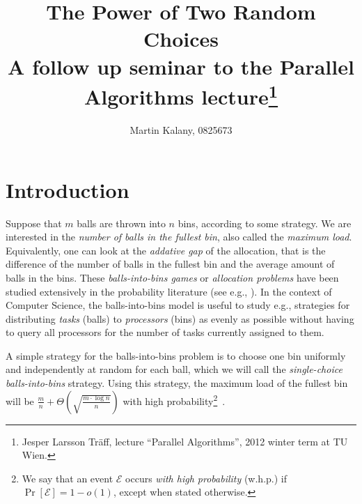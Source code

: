 \documentclass[a4paper,12pt]{article}
\begin{document}
\title{The Power of Two Random Choices\\ 
\large A follow up seminar to the Parallel Algorithms lecture\footnote{Jesper Larsson Träff, lecture ``Parallel Algorithms'', 2012 winter term at TU Wien.}}
\author{Martin Kalany, 0825673}

\maketitle


\begin{abstract}

\end{abstract}


\section{Introduction}
\label{sec:intro}
Suppose that $m$ balls are thrown into $n$ bins, according to some strategy. We are interested in the \emph{number of balls in the fullest bin}, also called the \emph{maximum load}. Equivalently, one can look at the \emph{addative gap} of the allocation, that is the difference of the number of balls in the fullest bin and the average amount of balls in the bins. These \emph{balls-into-bins games} or \emph{allocation problems} have been studied extensively in the probability literature (see e.g., \cite{JK77}). In the context of Computer Science, the balls-into-bins model is useful to study e.g., strategies for distributing \emph{tasks} (balls) to \emph{processors} (bins) as evenly as possible without having to query all processors for the number of tasks currently assigned to them.

A simple strategy for the balls-into-bins problem is to choose one bin uniformly and independently at random for each ball, which we will call the \emph{single-choice balls-into-bins} strategy. Using this strategy, the maximum load of the fullest bin will be $\frac{m}{n} + \Theta\left(\sqrt{\frac{m \cdot \log n}{n}}\right)$ with high probability\footnote{We say that an event $\mathcal E$ occurs \emph{with high probability} (w.h.p.) if $\Pr\left[\mathcal E \right] = 1 - o(1)$, except when stated otherwise.}~\cite{RS98}.
\end{document}
